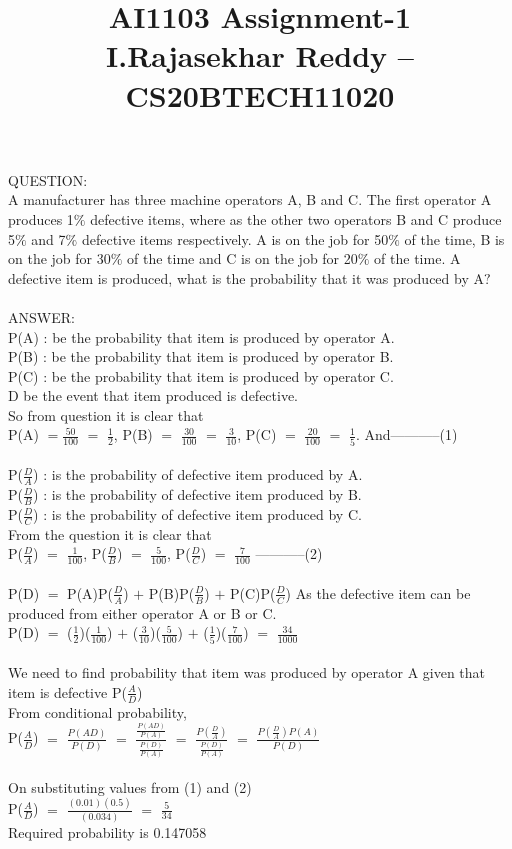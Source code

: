 \documentclass[]{article}
\title{}
\author{}
\begin{document}
\title{AI1103 Assignment-1 \\I.Rajasekhar Reddy -- CS20BTECH11020}
\maketitle
QUESTION:\\
A manufacturer has three machine operators A, B and C. The first operator A produces 1$\%$ defective items, where as the other two operators B and C produce 5$\%$ and 7$\%$ defective items respectively. A is on the job
for 50$\%$ of the time, B is on the job for 30$\%$ of the time and C is on the job for 20$\%$ of the time. A defective item is produced, what
is the probability that it was produced by A$?$
\\ \\
ANSWER:\\
P(A) : be the probability that item is produced by operator A.\\
P(B) : be the probability that item is produced by operator B.\\
P(C) : be the probability that item is produced by operator C.\\
D be the event that item produced is defective.\\ 
So from question it is clear that\\
P(A) $= \frac{50}{100}$ $=$ $\frac{1}{2}$,  P(B) $=$ $\frac{30}{100}$ $=$ $\frac{3}{10}$,  P(C) $=$ $\frac{20}{100}$ $=$ $\frac{1}{5}$.
And-----------(1)\\ \\
P($\frac{D}{A}$) : is the probability of defective item produced by A.\\
P($\frac{D}{B}$) : is the probability of defective item produced by B.\\
P($\frac{D}{C}$) : is the probability of defective item produced by C.\\ 
From the question it is clear that\\
P($\frac{D}{A}$) $=$ $\frac{1}{100}$,  P($\frac{D}{B}$) $=$ $\frac{5}{100}$,  P($\frac{D}{C}$) $=$ $\frac{7}{100}$ -----------(2)\\ \\
P(D) $=$ P(A)P($\frac{D}{A}$) $+$ P(B)P($\frac{D}{B}$) $+$  P(C)P($\frac{D}{C}$)  As the defective item can be produced from either operator A or B or C.\\
P(D) $=$ ($\frac{1}{2}$)($\frac{1}{100}$) $+$ ($\frac{3}{10}$)($\frac{5}{100}$) $+$ ($\frac{1}{5}$)($\frac{7}{100}$) $=$ $\frac{34}{1000}$ \\ \\
We need to find probability that item was produced by operator A given that item is defective P($\frac{A}{D}$)\\
From conditional probability, \\
P($\frac{A}{D}$) $=$ $\frac{P(AD)}{P(D)}$ $=$ 
$\frac{\frac{P(AD)}{P(A)}}{\frac{P(D)}{P(A)}}$ $=$ $\frac{P(\frac{D}{A})}{\frac{P(D)}{P(A)}}$ $=$
$\frac{P(\frac{D}{A})P(A)}{P(D)}$ \\ \\
On substituting values from (1) and (2) \\
P($\frac{A}{D}$) $=$ $\frac{(0.01)(0.5)}{(0.034)}$ $=$ $\frac{5}{34}$\\ 
Required probability is 0.147058
\end{document}
